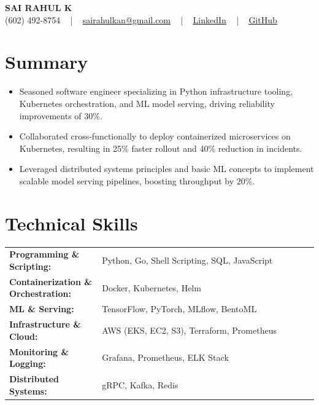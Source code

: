 \documentclass[letterpaper,11pt]{article}
\newcommand{\resumeItem}[1]{
  \item\footnotesize{
    {#1 \vspace{-2pt}}
  }
}
\newcommand{\resumeItemListStart}{\begin{itemize}[leftmargin=*]}
\newcommand{\resumeItemListEnd}{\end{itemize}\vspace{-5pt}}
\begin{document}
\begin{center}
    {\fontsize{14pt}{12pt}\selectfont \textbf{\MakeUppercase{Sai Rahul K}}}\\ \vspace{2pt}
    \fontsize{10pt}{12pt}\selectfont (602) 492-8754 ~ | ~ \href{mailto:sairahulkan@gmail.com}{sairahulkan@gmail.com} ~ | ~
    \href{https://www.linkedin.com/in/rq123/}{\color{blue}\underline{LinkedIn}} ~ | ~
    \href{https://github.com/kanrahuldo}{\color{blue}\underline{GitHub}}~
    \vspace{-8pt}
\end{center}

\section{Summary}
\fontsize{9pt}{10pt}\selectfont
\resumeItemListStart
    \resumeItem{Seasoned software engineer specializing in Python infrastructure tooling, Kubernetes orchestration, and ML model serving, driving reliability improvements of 30\%.}
    \resumeItem{Collaborated cross-functionally to deploy containerized microservices on Kubernetes, resulting in 25\% faster rollout and 40\% reduction in incidents.}
    \resumeItem{Leveraged distributed systems principles and basic ML concepts to implement scalable model serving pipelines, boosting throughput by 20\%.}
\resumeItemListEnd
\vspace{-6pt}

\section{Technical Skills}
        \vspace{-14pt}
        \begin{tabular}{p{0.3\linewidth} p{0.7\linewidth}}
            \textbf{Programming \& Scripting:} & Python, Go, Shell Scripting, SQL, JavaScript \\
            \textbf{Containerization \& Orchestration:} & Docker, Kubernetes, Helm \\
            \textbf{ML \& Serving:} & TensorFlow, PyTorch, MLflow, BentoML \\
            \textbf{Infrastructure \& Cloud:} & AWS (EKS, EC2, S3), Terraform, Prometheus \\
            \textbf{Monitoring \& Logging:} & Grafana, Prometheus, ELK Stack \\
            \textbf{Distributed Systems:} & gRPC, Kafka, Redis \\
        \end{tabular}
    \vspace{-15pt}
\end{document}
